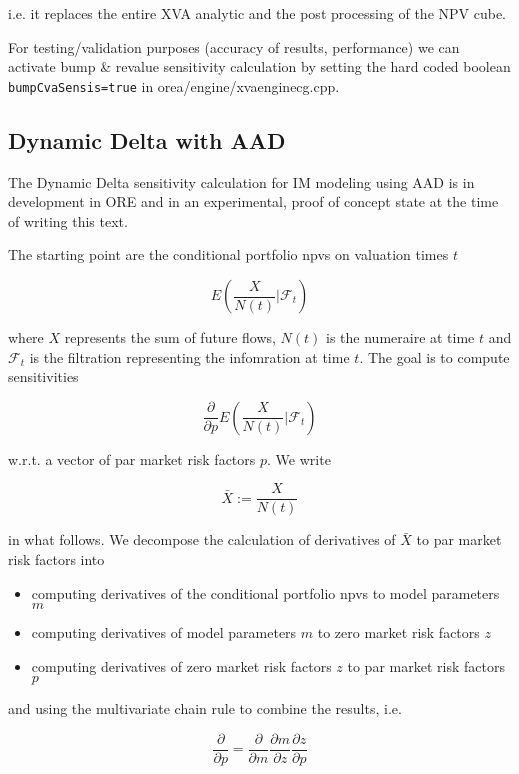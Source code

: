 i.e. it replaces the entire XVA analytic and the post processing of the NPV cube.

For testing/validation purposes (accuracy of results, performance) we can activate bump \& revalue sensitivity
calculation by setting the hard coded boolean {\tt bumpCvaSensis=true} in orea/engine/xvaenginecg.cpp.

\subsection{Dynamic Delta with AAD}

The Dynamic Delta sensitivity calculation for IM modeling using AAD is in development in ORE and in an experimental,
proof of concept state at the time of writing this text.

The starting point are the conditional portfolio npvs on valuation times $t$

$$
E\left( \frac{X}{N(t)} \bigg| \mathcal{F}_t \right)
$$

where $X$ represents the sum of future flows, $N(t)$ is the numeraire at time $t$ and $\mathcal{F}_t$ is the filtration representing
the infomration at time $t$. The goal is to compute sensitivities

$$
\frac{\partial}{\partial p}E\left( \frac{X}{N(t)} \bigg| \mathcal{F}_t \right)
$$

w.r.t. a vector of par market risk factors $p$. We write

$$
\bar{X} := \frac{X}{N(t)}
$$

in what follows. We decompose the calculation of derivatives of $\bar{X}$ to par market risk factors into

\begin{itemize}
\item computing derivatives of the conditional portfolio npvs to model parameters $m$
\item computing derivatives of model parameters $m$ to zero market risk factors $z$
\item computing derivatives of zero market risk factors $z$ to par market risk factors $p$
\end{itemize}

and using the multivariate chain rule to combine the results, i.e.

$$
\frac{\partial}{\partial p} = \frac{\partial}{\partial m} \frac{\partial m}{\partial z} \frac{\partial z}{\partial p}
$$

